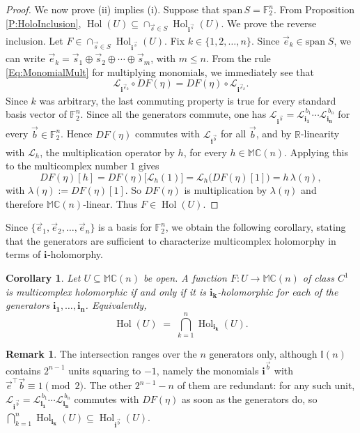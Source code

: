 \documentclass[12pt]{amsart}
\theoremstyle{plain}
\newtheorem{corollary}[theorem]{Corollary}
\theoremstyle{definition}
\newtheorem*{remark}{Remark}
\numberwithin{equation}{section}
\newcommand{\im}[1]{\mathbf{ i_{#1}}}
\newcommand{\mC}{\mathbb{C}}
\newcommand{\mM}{\mathbb{M}}
\newcommand{\mI}{\mathbb{I}}
\newcommand{\cL}{\mathcal{L}}
\DeclareMathOperator{\hol}{Hol}
\begin{document}
\begin{proof}
    We now prove (ii) implies (i). Suppose that $\mathrm{span} \, S = \mathbb{F}_2^n$. From Proposition \ref{P:HoloInclusion}, $\hol (U) \subseteq \cap_{\vec{s} \in S} \hol_{\im{}^{\vec{s}}} (U)$. We prove the reverse inclusion. Let $F \in \cap_{\vec{s} \in S} \hol_{\im{}^{\vec{s}}} (U)$. Fix $k \in \{ 1, 2, \ldots , n \}$. Since $\vec{e}_k \in \mathrm{span} \; S$, we can write $\vec{e}_k = \vec{s}_1 \oplus \vec{s}_2 \oplus \cdots \oplus \vec{s}_m$, with $m \leq n$. From the rule \eqref{Eq:MonomialMult} for multiplying monomials, we immediately see that
        $$
            \mathcal{L}_{\im{}^{\vec{e}_k}} \circ DF (\eta ) = DF (\eta ) \circ \mathcal{L}_{\im{}^{\vec{e}_k}} .
        $$
    Since $k$ was arbitrary, the last commuting property is true for every standard basis vector of $\mathbb{F}_2^n$. Since all the generators commute, one has
$\cL_{\im{}^{\vec b}} = \cL_{\im{1}}^{\,b_1}\cdots\cL_{\im{n}}^{\,b_n}$ for every $\vec b \in \mathbb{F}_2^{n}$. Hence $DF(\eta)$ commutes with $\cL_{\im{}^{\vec b}}$ for all $\vec b$, and by $\mathbb{R}$-linearity with $\cL_h$, the multiplication operator by $h$, for every $h \in \mM \mC(n)$. Applying this to the multicomplex number $1$ gives 
    \[
    DF(\eta)[h] = DF(\eta)\bigl[\cL_h(1)\bigr]
    = \cL_h\bigl(DF(\eta)[1]\bigr) = h\,\lambda(\eta),
    \]
with $\lambda (\eta ) := DF (\eta ) [1]$. So $DF(\eta)$ is multiplication by $\lambda(\eta)$ and therefore $\mM \mC(n)$-linear.
    Thus $F \in \hol(U)$.
\end{proof}


Since $\{ \vec{e}_1, \vec{e}_2, \ldots , \vec{e}_n \}$ is a basis for $\mathbb{F}_2^n$, we obtain the following corollary, stating that the generators are sufficient to characterize multicomplex holomorphy in terms of $\im{}$-holomorphy.

\begin{corollary}\label{C:hol-intersection}
Let $U \subseteq \mM \mC(n)$ be open. A function $F \colon U \to \mM \mC(n)$ of class $C^1$
is multicomplex holomorphic if and only if it is $\im{k}$-holomorphic for each of the
generators $\im{1}, \dots, \im{n}$. Equivalently,
\[
\hol(U) \;=\; \bigcap_{k=1}^{n} \hol_{\im{k}}(U).
\]
\end{corollary}

\begin{remark}
The intersection ranges over the $n$ generators only, although $\mI (n)$ contains
$2^{n-1}$ units squaring to $-1$, namely the monomials $\im{}^{\vec b}$ with
$\vec e^{\top}\vec b \equiv 1 \pmod 2$. The other $2^{n-1}-n$ of them are redundant: for any such
unit, $\cL_{\im{}^{\vec b}} = \cL_{\im{1}}^{\,b_1}\cdots\cL_{\im{n}}^{\,b_n}$
commutes with $DF(\eta)$ as soon as the generators do, so
$\bigcap_{k=1}^{n}\hol_{\im{k}}(U) \subseteq \hol_{\im{}^{\vec b}}(U)$. 
\end{remark}
\end{document}
